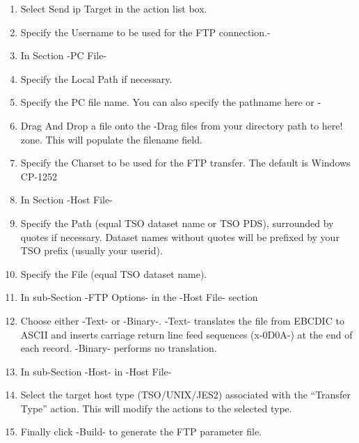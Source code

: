 \documentclass[letterpaper,10pt,english]{sphinxmanual}
\begin{document}
\begin{enumerate}
\def\theenumi{\arabic{enumi}}
\def\labelenumi{\theenumi .}
\makeatletter\def\p@enumii{\p@enumi \theenumi .}\makeatother
\item {} 
Select \textendash{}Send ip Target\textendash{} in the action list box.

\item {} 
Specify the Username to be used for the FTP connection.-

\item {} 
In Section -PC File-

\item {} 
Specify the Local Path if necessary.

\item {} 
Specify the PC file name. You can also specify the pathname here or -

\item {} 
Drag And Drop a file onto the -Drag files from your directory path to here!\textendash{} zone. This will populate the filename field.

\item {} 
Specify the Charset to be used for the FTP transfer. The default is Windows CP-1252

\item {} 
In Section -Host File-

\item {} 
Specify the Path (equal TSO dataset name or TSO PDS), surrounded by quotes if necessary. Dataset names without quotes will be prefixed by your TSO prefix (usually your userid).

\item {} 
Specify the File (equal TSO dataset name).

\item {} 
In sub-Section -FTP Options- in the -Host File- section

\item {} 
Choose either -Text- or -Binary-. -Text- translates the file from EBCDIC to ASCII and inserts carriage return line feed sequences (x-0D0A-) at the end of each record. -Binary- performs no translation.

\item {} 
In sub-Section -Host- in -Host File-

\item {} 
Select the target host type (TSO/UNIX/JES2) associated with the “Transfer Type” action. This will modify the actions to the selected type.

\item {} 
Finally click -Build- to generate the FTP parameter file.

\end{enumerate}
\end{document}
